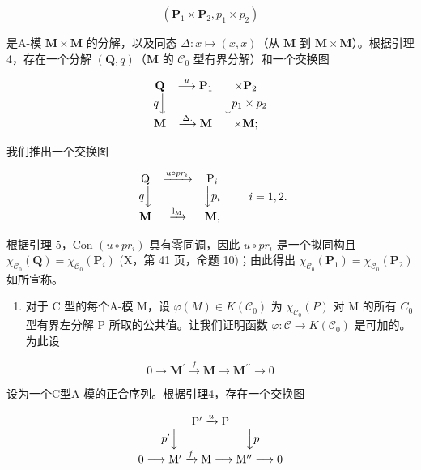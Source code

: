 \[
(\mathbf {P} _ {1} \times \mathbf {P} _ {2}, p _ {1} \times p _ {2})
\]

是A-模 \(\mathbf{M} \times \mathbf{M}\) 的分解，以及同态 \(\Delta : x \mapsto (x, x)\)（从 \(\mathbf{M}\) 到 \(\mathbf{M} \times \mathbf{M}\)）。根据引理 4，存在一个分解 \((\mathbf{Q}, q)\)（\(\mathbf{M}\) 的 \(\mathcal{C}_0\) 型有界分解）和一个交换图

\[
\begin{array}{c c c} \mathbf {Q} & \stackrel {{u}} {{\longrightarrow}} \mathbf {P} _ {1} & \times \mathbf {P} _ {2} \\ q \Big \downarrow & & \Big \downarrow p _ {1} \times p _ {2} \\ \mathbf {M} & \stackrel {{\Delta .}} {{\longrightarrow}} \mathbf {M} & \times \mathbf {M}; \end{array}
\]

我们推出一个交换图

\[
\begin{array}{c c c} \mathrm{Q} & \xrightarrow {u \circ p r _ {i}} & \mathrm{P} _ {i} \\ q \Big \downarrow & & \Big \downarrow p _ {i} \\ \mathbf {M} & \xrightarrow {\mathrm{l} _ {\mathrm{M}}} & \mathbf {M}, \end{array} \qquad i = 1, 2.
\]

根据引理 5，Con \((u \circ pr_i)\) 具有零同调，因此 \(u \circ pr_i\) 是一个拟同构且 \(\chi_{\mathcal{C}_0}(\mathbf{Q}) = \chi_{\mathcal{C}_0}(\mathbf{P}_i)\) (X，第 41 页，命题 10)；由此得出 \(\chi_{\mathcal{C}_0}(\mathbf{P}_1) = \chi_{\mathcal{C}_0}(\mathbf{P}_2)\) 如所宣称。

\begin{enumerate}
\def\labelenumi{\alph{enumi})}
\setcounter{enumi}{1}
\tightlist
\item
  对于 C 型的每个A-模 M，设 \(\varphi(M) \in K(\mathcal{C}_{0})\) 为 \(\chi_{\mathcal{C}_{0}}(P)\) 对 M 的所有 \(C_{0}\) 型有界左分解 P 所取的公共值。让我们证明函数 \(\varphi : \mathcal{C} \to K(\mathcal{C}_{0})\) 是可加的。为此设
\end{enumerate}

\[
0 \to \mathbf {M} ^ {\prime} \xrightarrow {f} \mathbf {M} \to \mathbf {M} ^ {\prime \prime} \to 0
\]

设为一个C型A-模的正合序列。根据引理4，存在一个交换图

\[
\begin{array}{c} \mathrm{P} ^ {\prime} \xrightarrow {u} \mathrm{P} \\ p ^ {\prime} \Big \downarrow \qquad \qquad \qquad \Big \downarrow p \\ 0 \longrightarrow \mathrm{M} ^ {\prime} \xrightarrow {f} \mathrm{M} \longrightarrow \mathrm{M} ^ {\prime \prime} \longrightarrow 0 \end{array}
\]

